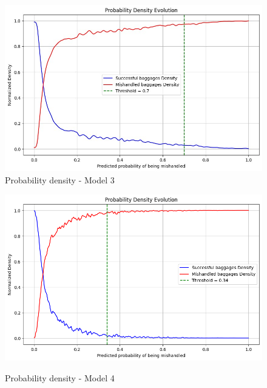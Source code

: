 \documentclass[12pt]{article}
\begin{document}
\begin{figure}
\begin{minipage}[c]{0.5\linewidth}
    \includegraphics[width=1\textwidth]{Probability_density_Model 3.jpg}\\
    \caption{Probability density - Model 3}
\end{minipage}
\hfill
\begin{minipage}[c]{0.5\linewidth}
    \includegraphics[width=1\textwidth]{Probability_density_Model 4.png}\\
    \caption{Probability density - Model 4}
\end{minipage}%
\end{figure}
\FloatBarrier
\end{document}
